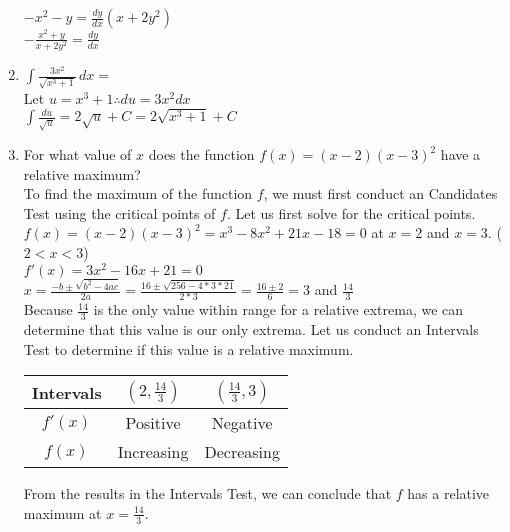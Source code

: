 \documentclass[10pt, letterpaper]{report}
\begin{document}
\begin{enumerate}
    $-x^{2}-y=\frac{dy}{dx}(x+2y^{2})$ \\

    $-\frac{x^{2}+y}{x+2y^{2}}=\frac{dy}{dx}$ \\

    \hline
  \item{$\int{\frac{3x^{2}}{\sqrt{x^{3}+1}}}\,dx=$} \\

    Let $u=x^{3}+1\therefore du=3x^{2}dx$ \\

    $\int{\frac{du}{\sqrt{u}}}=2\sqrt{u}+C=2\sqrt{x^{3}+1}+C$ \\

    \pagebreak
  \item{For what value of $x$ does the function $f(x)=(x-2)(x-3)^{2}$ have a relative maximum?} \\

    To find the maximum of the function $f$, we must first conduct an Candidates Test using the critical points of $f$. Let us first solve for the critical points.   \\

    $f(x)=(x-2)(x-3)^{2}=x^{3}-8x^{2}+21x-18=0$ at $x=2$ and $x=3$. ($2<x<3$) \\

    $f'(x)=3x^{2}-16x+21=0$ \\

    $x=\frac{-b\pm\sqrt{b^{2}-4ac}}{2a}=\frac{16\pm\sqrt{256-4*3*21}}{2*3}=\frac{16\pm2}{6}=3$ and $\frac{14}{3}$ \\

    Because $\frac{14}{3}$ is the only value within range for a relative extrema, we can determine that this value is our only extrema. Let us conduct an Intervals Test to determine if this value is a relative maximum.

    \begin{center}
      \begin{tabular}{| c | c | c |}
        \hline
        Intervals & $(2, \frac{14}{3})$ & $(\frac{14}{3}, 3)$ \\
        \hline
        $f'(x)$ & Positive & Negative \\
        \hline
        $f(x)$ & Increasing & Decreasing \\
        \hline
      \end{tabular}
    \end{center}

    From the results in the Intervals Test, we can conclude that $f$ has a relative maximum at $x=\frac{14}{3}$.

\end{enumerate}
\end{document}
